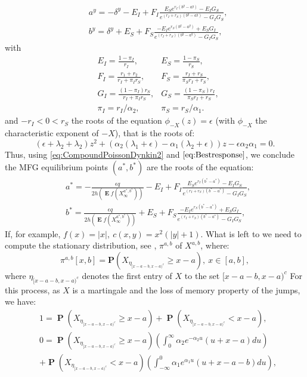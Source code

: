 \documentclass{article}
\renewcommand\P{\operatorname{\mathbf{P}}}
\newcommand\E{\operatorname{\mathbf{E}}}
\begin{document}
\begin{align}\label{eq:Bestresponse}
    &a^y=  -\delta^y -E_I+ F_I \frac{\displaystyle E_S e^{r_I (b^y-a^y)} -E_I G_S }{\displaystyle e^{(r_I +r_S)(b^y-a^y)} -G_I G_S },     \nonumber    \\
    &b^y=  \delta^y +E_S+ F_S \frac{-E_I e^{r_S(b^y-a^y)}+E_SG_I}{e^{(r_I+r_S)(b^y-a^y)}-G_I G_S},
\end{align}
with
\begin{align*}
    & E_I = \frac{1-\pi_I}{r_I}, & E_S = \frac{1-\pi_S}{r_S},  \\
    &F_I=\frac{r_1+r_2}{ r_I+\pi_I r_S}, &  F_S= \frac{r_I +r_S}{\pi_Sr_I+r_S}, \\
    &G_I=\frac{(1-\pi_I)r_S}{ r_I+\pi_I r_S}, &  G_S= \frac{(1-\pi_S)r_I}{\pi_S r_I +r_S}, \\
    & 
    \pi_I = r_I/\alpha_2,  & \pi_S=r_S/\alpha_1.
\end{align*}
and $-r_I<0<r_S$ the roots of the equation  $\phi_{-X}(z)=\epsilon $ (with $\phi_{-X} $ the characteristic exponent of $-X$), that is the roots of:
$$(\epsilon+\lambda_2+\lambda_2)z^2+(\alpha_2 (\lambda_1+\epsilon)-\alpha_1 (\lambda_2+\epsilon))z -\epsilon \alpha_2 \alpha_1=0   . $$
  Thus, using \eqref{eq:CompoundPoissonDynkin2} and $\eqref{eq:Bestresponse}$, we conclude the MFG equilibrium points $(a^{\ast},b^{\ast})$ are the roots of the equation:
\begin{align*}
    &a^{\ast}=  -\frac{\displaystyle \epsilon q}{2 h\left( \E f(X^{a^\ast,b^\ast}_{\infty}) \right) } -E_I+ F_I \frac{\displaystyle E_S e^{r_I (b^\ast-a^\ast)} -E_I G_S }{\displaystyle e^{(r_I +r_S)(b^\ast-a^\ast)} -G_I G_S },     \nonumber    \\
    &b^{\ast}=  \frac{\displaystyle \epsilon q}{2 h \left( \E f(X^{a^\ast,b^\ast}_{\infty})\right) } +E_S+ F_S \frac{-E_I e^{r_S(b^\ast-a^\ast)}+E_SG_I}{e^{(r_I+r_S)(b^\ast-a^\ast)}-G_I G_S},
\end{align*}
If, for example, $f(x)=\vert x \vert, \ c(x,y)=x^2 (\vert y \vert +1)$. What is left to    we need to compute the stationary distribution, see \cite[Chapter V]{AAGP}, $\pi^{a,b}$ of $X^{a,b}$, where:
\begin{equation}\label{E:stationary}
\pi^{a,b}[x,b]=\mathbf{P}(X_{\eta_{[x-a-b,x-a)^c}}\geq x-a ), \ x\in[a,b] ,
\end{equation}
where $\eta_{[x-a-b,x-a)^c}$ denotes the first entry of $X$ to the set $ [x-a-b,x-a)^c$
For this process, as $X$ is a martingale and the loss of memory property of the jumps, we have:
\begin{align*}
    &1= \P (X_{\eta_{[x-a-b,x-a)^c}}\geq x-a  )  + \P (X_{\eta_{[x-a-b,x-a)^c}}<x-a), \\
    & 0=\P (X_{\eta_{[x-a-b,x-a)^c}}\geq x-a  )\left(\int_0^{\infty}\alpha_2 e^{- \alpha_2 u}(u+x-a) du \right) \\   & +\P (X_{\eta_{[x-a-b,x-a)^c}}<x-a) \left(\int_{-\infty}^{0}\alpha_1e^{\alpha_1 u}(u +x-a-b)du \right) , 
    \end{align*}
\end{document}
